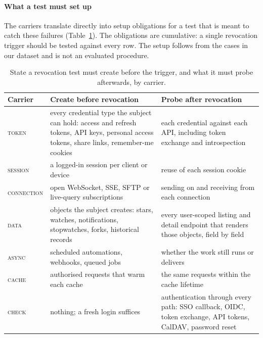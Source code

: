 \documentclass[preprint,12pt]{elsarticle}
\begin{document}
\begin{table}[t]
\centering\small
\caption{GitHub severity rating by carrier (all 229 cases).}
\label{tab:severity}

\end{table}

\paragraph{What a test must set up}
The carriers translate directly into setup obligations for a test that is meant to catch these failures
(Table~\ref{tab:setup}). The obligations are cumulative: a single revocation trigger should be tested against every row.
The setup follows from the cases in our dataset and is not an evaluated procedure.

\begin{table}[t]
\centering\footnotesize
\caption{State a revocation test must create before the trigger, and what it must probe afterwards, by carrier.}
\label{tab:setup}
\begin{tabularx}{\linewidth}{@{}l>{\raggedright\arraybackslash}X>{\raggedright\arraybackslash}X@{}}
\toprule
Carrier & Create before revocation & Probe after revocation \\
\midrule
\textsc{token} & every credential type the subject can hold: access and refresh tokens, API keys, personal access tokens, share links, remember-me cookies & each credential against each API, including token exchange and introspection \\
\textsc{session} & a logged-in session per client or device & reuse of each session cookie \\
\textsc{connection} & open WebSocket, SSE, SFTP or live-query subscriptions & sending on and receiving from each connection \\
\textsc{data} & objects the subject creates: stars, watches, notifications, stopwatches, forks, historical records & every user-scoped listing and detail endpoint that renders those objects, field by field \\
\textsc{async} & scheduled automations, webhooks, queued jobs & whether the work still runs or delivers \\
\textsc{cache} & authorised requests that warm each cache & the same requests within the cache lifetime \\
\textsc{check} & nothing; a fresh login suffices & authentication through every path: SSO callback, OIDC, token exchange, API tokens, CalDAV, password reset \\
\bottomrule
\end{tabularx}
\end{table}
\end{document}
